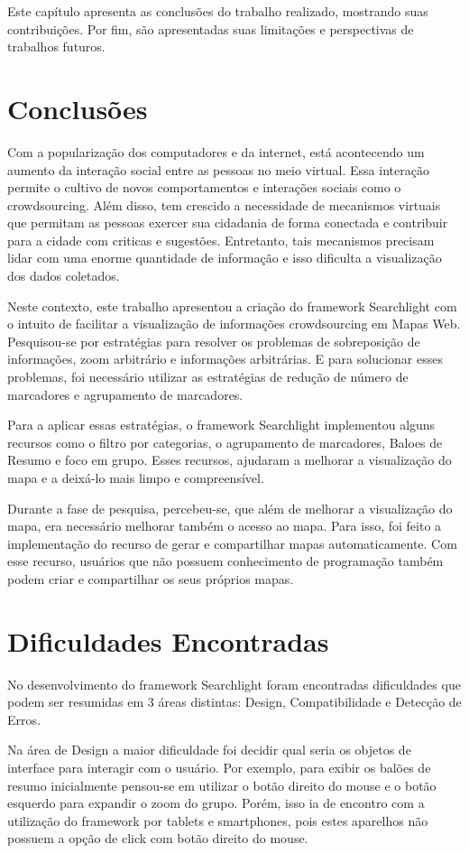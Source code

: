 Este capítulo apresenta as conclusões do trabalho realizado, mostrando suas contribuições. Por fim, são apresentadas suas limitações e perspectivas de trabalhos futuros.

\section{Conclusões}
Com a popularização dos computadores e da internet, está acontecendo um aumento da interação social entre as pessoas no meio virtual. Essa interação permite o cultivo de novos comportamentos e interações sociais como o crowdsourcing. Além disso, tem crescido a necessidade de mecanismos virtuais que permitam as pessoas exercer sua cidadania de forma conectada e contribuir para a cidade com  criticas e sugestões. Entretanto, tais mecanismos precisam lidar com uma enorme quantidade de informação e isso dificulta a visualização dos dados coletados.

Neste contexto, este trabalho apresentou a criação do framework Searchlight com o intuito de facilitar a visualização de informações crowdsourcing em Mapas Web. Pesquisou-se por estratégias para resolver os problemas de sobreposição de informações, zoom arbitrário e informações arbitrárias. E para solucionar esses problemas, foi necessário utilizar as estratégias de redução de número de marcadores e agrupamento de marcadores.

Para a aplicar essas estratégias, o framework Searchlight implementou alguns recursos como o filtro por categorias, o agrupamento de marcadores, Baloes de Resumo e foco em grupo. Esses recursos, ajudaram a melhorar a visualização do mapa e a deixá-lo mais limpo e compreensível.

Durante a fase de pesquisa, percebeu-se, que além de melhorar a visualização do mapa, era necessário  melhorar também o acesso ao mapa. Para isso, foi feito a implementação do recurso de gerar e compartilhar mapas automaticamente. Com esse recurso, usuários que não possuem conhecimento de programação também podem criar  e compartilhar os seus próprios mapas.

\section{Dificuldades Encontradas}
No desenvolvimento do framework Searchlight foram encontradas dificuldades que podem ser resumidas em 3 áreas distintas: Design, Compatibilidade e Detecção de Erros.

Na área de Design a maior dificuldade foi decidir qual seria os objetos de interface para interagir com o usuário. Por exemplo, para exibir os balões de resumo inicialmente pensou-se em utilizar o botão direito do mouse e o botão esquerdo para expandir o zoom do grupo. Porém, isso ia de encontro com a utilização do framework por tablets e smartphones, pois estes aparelhos não possuem a opção de click com botão direito do mouse. 


